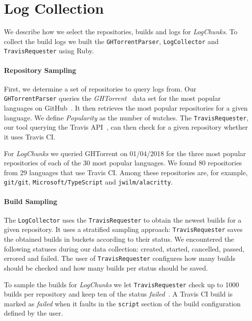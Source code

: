 \documentclass[\myrootdir/main.tex]{subfiles}
\begin{document}
\section{Log Collection}
We describe how we select the repositories, builds and logs for \emph{LogChunks}.
To collect the build logs we built the \texttt{GHTorrentParser}, \texttt{LogCollector} and \texttt{TravisRequester} using Ruby.

\paragraph{Repository Sampling}
First, we determine a set of repositories to query logs from.
Our \texttt{GHTorrentParser} queries the \emph{GHTorrent}~\cite{gousios2013ghtorrent} data set for the most popular languages on GitHub~\cite{github2019website}.
It then retrieves the most popular repositories for a given language.
We define \emph{Popularity} as the number of watches.
The \texttt{TravisRequester}, our tool querying the Travis API~\cite{travisci2019apidoc}, can then check for a given repository whether it uses Travis CI\@.

For \emph{LogChunks} we queried GHTorrent on 01/04/2018 for the three most popular repositories of each of the 30 most popular languages.
We found 80 repositories from 29 languages that use Travis CI\@.
Among these repositories are, for example, \texttt{git/git}, \texttt{Microsoft/TypeScript} and \texttt{jwilm/alacritty}.

\paragraph{Build Sampling}
The \texttt{LogCollector} uses the \texttt{TravisRequester} to obtain the newest builds for a given repository.
It uses a stratified sampling approach: \texttt{TravisRequester} saves the obtained builds in buckets according to their status.
We encountered the following statuses during our data collection: created, started, cancelled, passed, errored and failed.
The user of \texttt{TravisRequester} configures how many builds should be checked and how many builds per status should be saved.

To sample the builds for \emph{LogChunks} we let \texttt{TravisRequester} check up to 1000 builds per repository and keep ten of the status \emph{failed}~\cite{travis2009buildstatus}.
A Travis CI build is marked as \emph{failed} when it faults in the \texttt{script} section of the build configuration defined by the user.
\end{document}
